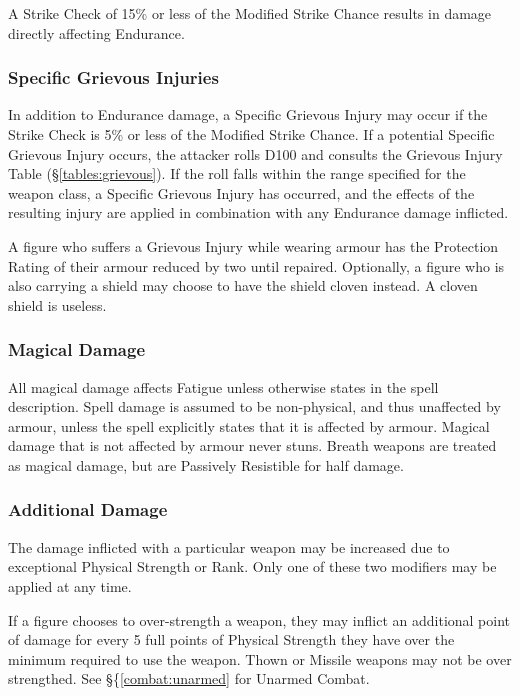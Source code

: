 \begin{multicols*}{3}
A Strike Check of 15\% or less of the Modified Strike Chance results
in damage directly affecting Endurance.

\subsubsection{Specific Grievous Injuries}

In addition to Endurance damage, a Specific Grievous Injury may occur
if the Strike Check is 5\% or less of the Modified Strike Chance. If a
potential Specific Grievous Injury occurs, the attacker rolls D100 and
consults the Grievous Injury Table (\S \ref{tables:grievous}). If the
roll falls within the range specified for the weapon class, a Specific
Grievous Injury has occurred, and the effects of the resulting injury
are applied in combination with any Endurance damage inflicted.

A figure who suffers a Grievous Injury while wearing armour has the
Protection Rating of their armour reduced by two until
repaired. Optionally, a figure who is also carrying a shield may
choose to have the shield cloven instead. A cloven shield is useless.

\subsubsection{Magical Damage}

All magical damage affects Fatigue unless otherwise states in the
spell description. Spell damage is assumed to be non-physical, and
thus unaffected by armour, unless the spell explicitly states that it
is affected by armour. Magical damage that is not affected by armour
never stuns. Breath weapons are treated as magical damage, but are
Passively Resistible for half damage.

\subsubsection{Additional Damage}

The damage inflicted with a particular weapon may be increased due to
exceptional Physical Strength or Rank. Only one of these two modifiers
may be applied at any time.

If a figure chooses to over-strength a weapon, they may inflict an
additional point of damage for every 5 full points of Physical
Strength they have over the minimum required to use the weapon.  Thown
or Missile weapons may not be over strengthed.  See
\S\{\ref{combat:unarmed} for Unarmed Combat.


\end{multicols*}
